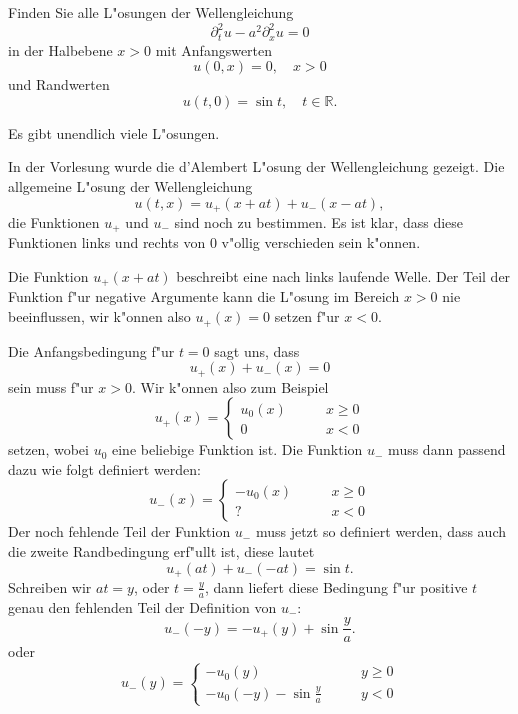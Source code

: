 Finden Sie alle L"osungen der Wellengleichung
\[
\partial_t^2u-a^2\partial_x^2u=0
\]
in der Halbebene $x>0$ mit Anfangswerten
\[
u(0,x)=0,\quad x>0
\]
und Randwerten
\[
u(t,0)=\sin t,\quad t\in\mathbb R.
\]

\begin{hinweis}
Es gibt unendlich viele L"osungen.
\end{hinweis}

\begin{loesung}
In der Vorlesung wurde die d'Alembert L"osung der Wellengleichung
gezeigt. Die allgemeine L"osung der Wellengleichung
\[
u(t,x)
=
u_+(x+at)+u_-(x-at),
\]
die Funktionen $u_+$ und $u_-$ sind noch zu bestimmen. Es ist klar,
dass diese Funktionen links und rechts von $0$ v"ollig verschieden sein
k"onnen.

Die Funktion $u_+(x+at)$ beschreibt eine nach links laufende
Welle. Der Teil der Funktion f"ur negative Argumente kann
die L"osung im Bereich $x>0$ nie
beeinflussen, wir k"onnen also $u_+(x)=0$ setzen f"ur $x<0$.

Die Anfangsbedingung f"ur $t=0$ sagt uns, dass
\[
u_+(x)+u_-(x)=0
\]
sein muss f"ur $x>0$. Wir k"onnen also zum Beispiel
\[
u_+(x)=\begin{cases}u_0(x)&\qquad x\ge 0\\
0&\qquad x<0
\end{cases}
\]
setzen, wobei $u_0$ eine beliebige Funktion ist. Die Funktion $u_-$ muss
dann passend dazu wie folgt definiert werden:
\[
u_-(x)=\begin{cases}
-u_0(x)&\qquad x\ge 0\\
?&\qquad x<0
\end{cases}
\]
Der noch fehlende Teil der Funktion $u_-$ muss jetzt so definiert werden,
dass auch die zweite Randbedingung erf"ullt ist, diese lautet
\[
u_+(at)+u_-(-at)=\sin t.
\]
Schreiben wir $at=y$, oder $t=\frac{y}{a}$, dann liefert diese Bedingung
f"ur positive $t$ genau den fehlenden Teil der Definition von $u_-$:
\[
u_-(-y)=-u_+(y)+\sin \frac{y}{a}.
\]
oder
\[
u_-(y)=\begin{cases}
-u_0(y)&\qquad y\ge 0\\
-u_0(-y)-\sin{\displaystyle\frac{y}{a}}&\qquad y<0
\end{cases}
\]
\end{loesung}
